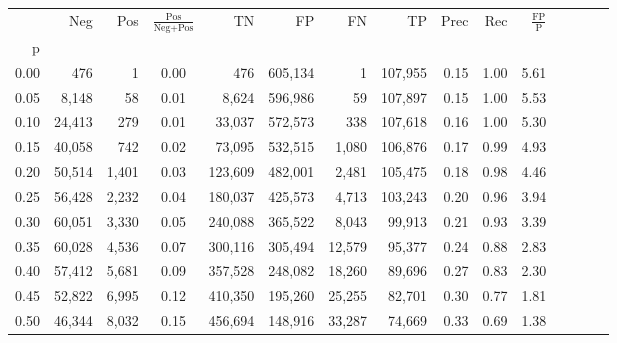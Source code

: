 \begin{tabular}{rrrcrrrrrrrrrrr}
\toprule
{} &     Neg &    Pos & $\frac{\text{Pos}}{\text{Neg}+\text{Pos}}$ &       TN &       FP &       FN &       TP &  Prec &   Rec & $\frac{\text{FP}}{\text{P}}$ \\
p    &         &        &                                            &          &          &          &          &       &       &                              \\
\midrule
0.00 &     476 &      1 &                                       0.00 &      476 &  605,134 &        1 &  107,955 &  0.15 &  1.00 &                         5.61 \\
0.05 &   8,148 &     58 &                                       0.01 &    8,624 &  596,986 &       59 &  107,897 &  0.15 &  1.00 &                         5.53 \\
0.10 &  24,413 &    279 &                                       0.01 &   33,037 &  572,573 &      338 &  107,618 &  0.16 &  1.00 &                         5.30 \\
0.15 &  40,058 &    742 &                                       0.02 &   73,095 &  532,515 &    1,080 &  106,876 &  0.17 &  0.99 &                         4.93 \\
0.20 &  50,514 &  1,401 &                                       0.03 &  123,609 &  482,001 &    2,481 &  105,475 &  0.18 &  0.98 &                         4.46 \\
0.25 &  56,428 &  2,232 &                                       0.04 &  180,037 &  425,573 &    4,713 &  103,243 &  0.20 &  0.96 &                         3.94 \\
0.30 &  60,051 &  3,330 &                                       0.05 &  240,088 &  365,522 &    8,043 &   99,913 &  0.21 &  0.93 &                         3.39 \\
0.35 &  60,028 &  4,536 &                                       0.07 &  300,116 &  305,494 &   12,579 &   95,377 &  0.24 &  0.88 &                         2.83 \\
0.40 &  57,412 &  5,681 &                                       0.09 &  357,528 &  248,082 &   18,260 &   89,696 &  0.27 &  0.83 &                         2.30 \\
0.45 &  52,822 &  6,995 &                                       0.12 &  410,350 &  195,260 &   25,255 &   82,701 &  0.30 &  0.77 &                         1.81 \\
0.50 &  46,344 &  8,032 &                                       0.15 &  456,694 &  148,916 &   33,287 &   74,669 &  0.33 &  0.69 &                         1.38 \\

\end{tabular}
